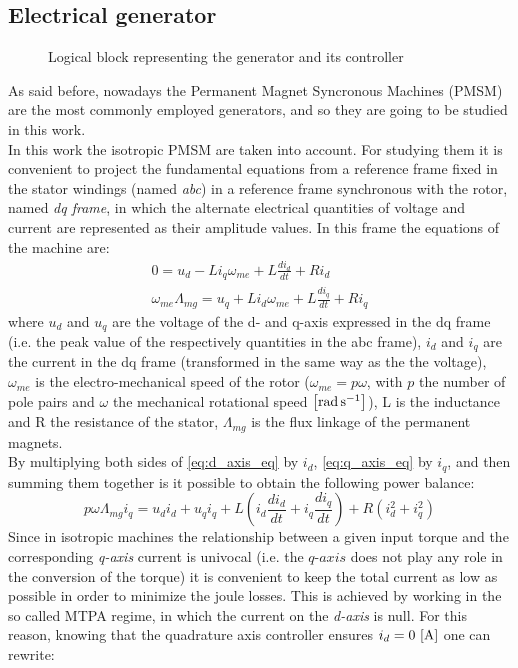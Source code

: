 \subsection{Electrical generator}
\begin{figure}[htb]
  \centering
  
  \caption{Logical block representing the generator and its controller}
  \label{fig:d_generator_block}
\end{figure}

As said before, nowadays the Permanent Magnet Syncronous Machines (PMSM) are the most commonly employed generators, and so they are going to be studied in this work.\\
In this work the isotropic \acrshort{PMSM} are taken into account. For studying them it is convenient to project the fundamental equations from a reference frame fixed in the stator windings (named \textit{abc}) in a reference frame synchronous with the rotor, named \textit{dq frame}, in which the alternate electrical quantities of voltage and current are represented as their amplitude values. 
In this frame the equations of the machine are:
\begin{gather}
  0=u_d-Li_q\omega_{me}+L\frac{di_d}{dt}+Ri_d 
  \label{eq:d_axis_eq}\\
  \omega_{me}\Lambda_{mg}=u_q+Li_d\omega_{me}+L\frac{di_q}{dt}+Ri_q
  \label{eq:q_axis_eq}
\end{gather}
where $u_d$ and $u_q$ are the voltage of the d- and q-axis expressed in the dq frame (i.e. the peak value of the respectively quantities in the abc frame), $i_d$ and $i_q$ are the current in the dq frame (transformed in the same way as the the voltage), $\omega_{me}$ is the electro-mechanical speed of the rotor ($\omega_{me}=p\omega$, with $p$ the number of pole pairs and $\omega$ the mechanical rotational speed $\left[\si{\radian \per \second}\right]$), L is the inductance and R the resistance of the stator, $\Lambda_{mg}$ is the flux linkage of the permanent magnets.\\
By multiplying both sides of \autoref{eq:d_axis_eq} by $i_d$, \autoref{eq:q_axis_eq} by $i_q$, and then summing them together is it possible to obtain the following power balance:
\begin{equation}
  p\omega\Lambda_{mg}i_q=u_di_d + u_qi_q+ L\left(i_d\frac{di_d}{dt} + i_q\frac{di_q}{dt}\right) + R(i_d^2 + i_q^2)
  \label{eq:gen_power_balance}
\end{equation}
Since in isotropic machines the relationship between a given input torque and the corresponding \textit{q-axis} current is univocal (i.e. the $\textit{q-axis}$ does not play any role in the conversion of the torque) it is convenient to keep the total current as low as possible in order to minimize the joule losses. This is achieved by working in the so called \acrfull{MTPA} regime, in which the current on the \textit{d-axis} is null. For this reason, knowing that the quadrature axis controller ensures $i_d=0 \, \left[\si{\ampere}\right]$ one can rewrite:
